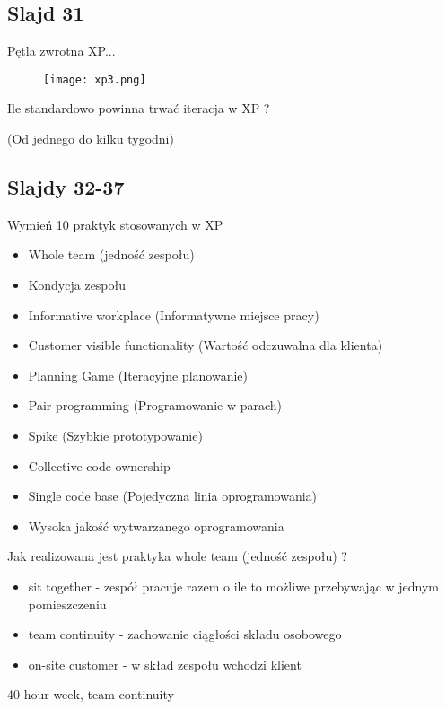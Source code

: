 \documentclass[a4paper,15pt]{article}
\newcommand{\question}[2]{
    \begin{tcolorbox}[colback=mRed!5!white,colframe=mRed,title={Kolokwium 2018 #1}]
        #2
    \end{tcolorbox}
}
\begin{document}
\subsection{Slajd 31}
Pętla zwrotna XP... 
\begin{figure}[H]
\centerline{\texttt{[image: xp3.png]}}
\end{figure}


\question{}{
Ile standardowo powinna trwać iteracja w XP ?
}
(Od jednego do kilku tygodni)

\subsection{Slajdy 32-37}
\begin{framed}
Wymień 10 praktyk stosowanych w XP
\end{framed}

\begin{itemize}
\item Whole team (jedność zespołu)
\item Kondycja zespołu
\item Informative workplace (Informatywne miejsce pracy)
\item Customer visible functionality (Wartość odczuwalna dla klienta)
\item Planning Game (Iteracyjne planowanie)
\item Pair programming (Programowanie w parach)
\item Spike (Szybkie prototypowanie)
\item Collective code ownership
\item Single code base (Pojedyczna linia oprogramowania)
\item Wysoka jakość wytwarzanego oprogramowania
\end{itemize}

\begin{framed}
Jak realizowana jest praktyka whole team (jedność zespołu) ?
\end{framed}
\begin{itemize}
\item sit together - zespół pracuje razem o ile to możliwe przebywając w jednym pomieszczeniu
\item team continuity - zachowanie ciągłości składu osobowego
\item on-site customer - w skład zespołu wchodzi klient
\end{itemize}

\question{}{
40-hour week, team continuity 
}
\end{document}
